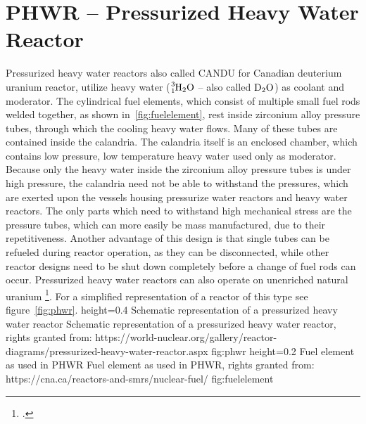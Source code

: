 \section{PHWR – Pressurized Heavy Water Reactor}
Pressurized heavy water reactors also called CANDU for Canadian deuterium uranium reactor, utilize
heavy water ($\ce{^{3}_{1}H_{2}O}$ – also called $\ce{D_{2}O}$) as coolant and moderator. The cylindrical
fuel elements, which consist of multiple small fuel rods welded together, as shown in~\ref{fig:fuelelement},
rest inside zirconium alloy pressure tubes, through which the cooling heavy water flows. Many of these tubes are
contained inside the calandria. The calandria itself is an enclosed chamber, which contains low pressure,
low temperature heavy water used only as moderator. Because only the heavy water inside the zirconium alloy
pressure tubes is under high pressure, the calandria need not be able to withstand the pressures, which
are exerted upon the vessels housing pressurize water reactors and heavy water reactors. The only parts
which need to withstand high mechanical stress are the pressure tubes, which can more easily be mass
manufactured, due to their repetitiveness. Another advantage of this design is that single tubes can
be refueled  during reactor operation, as they can be disconnected, while other reactor designs need to be shut down completely
before a change of fuel rods can occur. Pressurized heavy water reactors can also operate on unenriched
natural uranium \footcite[141-198]{engHandbook}. For a simplified representation of a reactor of this
type see figure~\ref{fig:phwr}.
    {height=0.4\textheight}
    {Schematic representation of a pressurized heavy water reactor}
    {Schematic representation of a pressurized heavy water reactor, rights granted from: https://world-nuclear.org/gallery/reactor-diagrams/pressurized-heavy-water-reactor.aspx}
    {fig:phwr}
    {height=0.2\textheight}
    {Fuel element as used in PHWR}
    {Fuel element as used in PHWR, rights granted from: https://cna.ca/reactors-and-smrs/nuclear-fuel/}
    {fig:fuelelement}
\pagebreak
